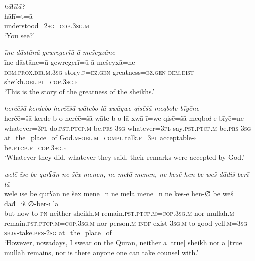 \ea \label{ZB.55}
\textit{hāɫītā?} \\ 
\gll hāɫī=t=ā \\ 
 understood\textsc{=\textsc{2sg}}\textsc{=cop}\textsc{.3sg}\textsc{.m} \\ 
\glt `You see?'
\z 
 
\ea \label{ZB.58}
\textit{īne dāstānū gewregerīū ā mešeyxāne} \\ 
\gll īne dāstāne=ū gewregerī=ū ā mešeyxā=ne \\ 
 \textsc{dem.prox}\textsc{.dir}\textsc{.m}\textsc{.3sg} story\textsc{.f}\textsc{\textsc{=ez.gen}} greatness\textsc{\textsc{=ez.gen}} \textsc{dem.dist} sheikh\textsc{.obl}\textsc{.pl}\textsc{=cop}\textsc{.3sg}\textsc{.f} \\ 
\glt `This is the story of the greatness of the sheikhs.'
\z 
 
\ea \label{ZB.59}
\textit{herčēšā kerdebo herčēšā wātebo lā xwāywe qisēšā meqboɫe bīyēne} \\ 
\gll herčē=šā kerde b-o herčē=šā wāte b-o lā xwā-ī=we qisē=šā meqboɫ-e bīyē=ne \\ 
 whatever\textsc{=3pl} do\textsc{.pst}\textsc{.ptcp}\textsc{.m} be\textsc{.prs}\textsc{-3sg} whatever\textsc{=3pl} say\textsc{.pst}\textsc{.ptcp}\textsc{.m} be\textsc{.prs}\textsc{-3sg} at\_the\_place\_of God\textsc{.m}\textsc{-obl}\textsc{.m}\textsc{=compl} talk\textsc{.f}\textsc{=3pl} acceptable\textsc{-f} be\textsc{.ptcp}\textsc{.f}\textsc{=cop}\textsc{.3sg}\textsc{.f} \\ 
\glt `Whatever they did, whatever they said, their remarks were accepted by God.'
\z 
 
\ea \label{ZB.60}
\textit{welē īse be qurʕān ne šēx menen, ne meɫā menen, ne kesē hen be weš dāđiš berī lā} \\ 
\gll welē īse be qurʕān ne šēx mene=n ne meɫā mene=n ne kes-ē hen-∅ be weš dāđ=iš ∅-ber-ī lā \\ 
 but now to \textsc{pn} neither sheikh\textsc{.m} remain\textsc{.pst}\textsc{.ptcp}\textsc{.m}\textsc{=cop}\textsc{.3sg}\textsc{.m} nor mullah\textsc{.m} remain\textsc{.pst}\textsc{.ptcp}\textsc{.m}\textsc{=cop}\textsc{.3sg}\textsc{.m} nor person\textsc{.m}\textsc{-indf} exist\textsc{-3sg}\textsc{.m} to good yell\textsc{.m}\textsc{=3sg} \textsc{sbjv-}take\textsc{.prs}-\textsc{2sg} at\_the\_place\_of \\ 
\glt `However, nowadays, I swear on the Quran, neither a [true] sheikh nor a [true] mullah remains, nor is there anyone one can take counsel with.'
\z 
 
